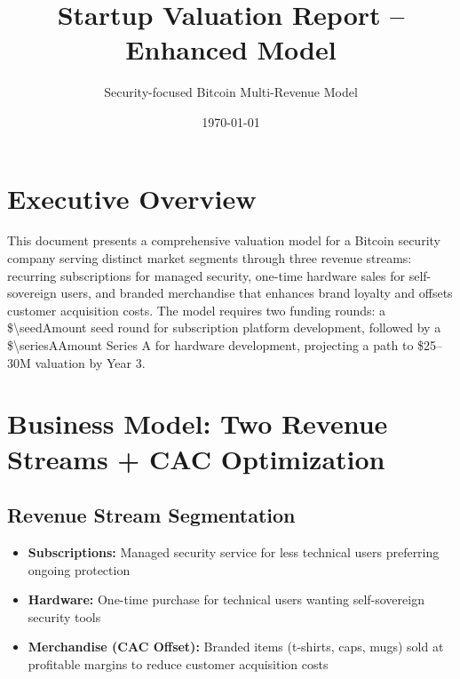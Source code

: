 \documentclass[11pt]{article}
\begin{document}
\title{Startup Valuation Report -- Enhanced Model}
\author{Security-focused Bitcoin Multi-Revenue Model}
\date{\today}
\maketitle

\section*{Executive Overview}
This document presents a comprehensive valuation model for a Bitcoin security company serving distinct market segments through three revenue streams: recurring subscriptions for managed security, one-time hardware sales for self-sovereign users, and branded merchandise that enhances brand loyalty and offsets customer acquisition costs. The model requires two funding rounds: a \$\num{\seedAmount} seed round for subscription platform development, followed by a \$\num{\seriesAAmount} Series A for hardware development, projecting a path to \$\num{25}--\num{30}M valuation by Year 3.

\section{Business Model: Two Revenue Streams + CAC Optimization}

\subsection{Revenue Stream Segmentation}
\begin{itemize}
  \item \textbf{Subscriptions:} Managed security service for less technical users preferring ongoing protection
  \item \textbf{Hardware:} One-time purchase for technical users wanting self-sovereign security tools
  \item \textbf{Merchandise (CAC Offset):} Branded items (t-shirts, caps, mugs) sold at profitable margins to reduce customer acquisition costs
\end{itemize}
\end{document}
